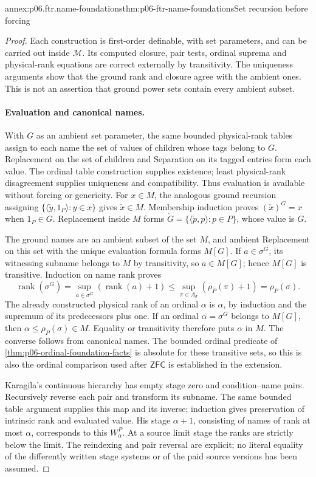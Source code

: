 \begin{annexitem}{annex:p06.ftr.name-foundations}{thm:p06-ftr-name-foundations}{Set recursion before forcing}
\begin{proof}
Each construction is first-order definable, with set parameters, and can
be carried out inside \(\mathcal M\). Its computed closure, pair tests,
ordinal suprema and physical-rank equations are correct externally by
transitivity. The uniqueness arguments show that the ground rank and
closure agree with the ambient ones. This is not an assertion that ground
power sets contain every ambient subset.

\paragraph{Evaluation and canonical names.}
With \(G\) as an ambient set parameter, the same bounded physical-rank
tables assign to each name the set of values of children whose tags belong
to \(G\). Replacement on the set of children and Separation on its
tagged entries form each value. The ordinal table construction supplies
existence; least physical-rank disagreement supplies uniqueness and
compatibility. Thus evaluation is available without forcing or genericity.
For \(x\in M\), the analogous ground recursion assigning
\(\{\langle\check y,1_P\rangle:y\in x\}\) gives \(\check x\in M\).
Membership induction proves \((\check x)^G=x\) when \(1_P\in G\).
Replacement inside \(M\) forms
\(\dot G=\{\langle\check p,p\rangle:p\in P\}\), whose value is \(G\).

The ground names are an ambient subset of the set \(M\), and ambient
Replacement on this set with the unique evaluation formula forms
\(M[G]\). If \(a\in\sigma^G\), its witnessing subname belongs to \(M\)
by transitivity, so \(a\in M[G]\); hence \(M[G]\) is transitive.
Induction on name rank proves
\[
 \operatorname{rank}(\sigma^G)
 =\sup_{a\in\sigma^G}(\operatorname{rank}(a)+1)
 \leq\sup_{\pi\in A_\sigma}(\rho_P(\pi)+1)=\rho_P(\sigma).
\]
The already constructed physical rank of an ordinal \(\alpha\) is
\(\alpha\), by induction and the supremum of its predecessors plus one.
If an ordinal \(\alpha=\sigma^G\) belongs to \(M[G]\), then
\(\alpha\leq\rho_P(\sigma)\in M\). Equality or transitivity therefore
puts \(\alpha\) in \(M\). The converse follows from canonical names.
The bounded ordinal predicate of \cref{thm:p06-ordinal-foundation-facts}
is absolute for these transitive sets, so this is also the ordinal
comparison used after \(\mathsf{ZFC}\) is established in the extension.

Karagila's continuous hierarchy has empty stage zero and
condition--name pairs. Recursively reverse each pair and transform its
subname. The same bounded table argument supplies this map and its inverse;
induction gives preservation of intrinsic rank and evaluated value.
His stage \(\alpha+1\), consisting of names of rank at most \(\alpha\),
corresponds to this \(W_\alpha^P\). At a source limit stage the ranks
are strictly below the limit. The reindexing and pair reversal are
explicit; no literal equality of the differently written stage systems
or of the paid source versions has been assumed.
\end{proof}
\end{annexitem}

